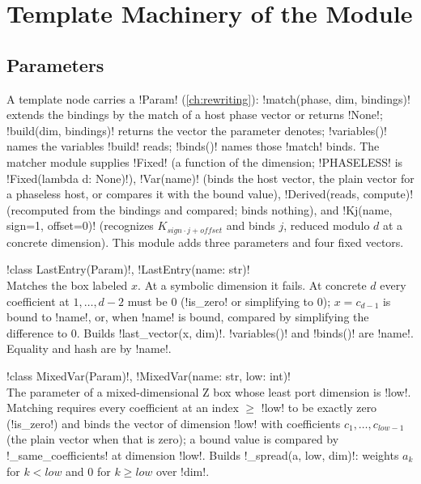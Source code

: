 \section{Template Machinery of the Module}\label{sec:completeness-machinery}

\subsection{Parameters}

A template node carries a \py!Param! (\cref{ch:rewriting}): \py!match(phase, dim, bindings)!
extends the bindings by the match of a host phase vector or returns \py!None!;
\py!build(dim, bindings)! returns the vector the parameter denotes; \py!variables()! names the
variables \py!build! reads; \py!binds()! names those \py!match! binds. The matcher module
supplies \py!Fixed! (a function of the dimension; \py!PHASELESS! is \py!Fixed(lambda d: None)!),
\py!Var(name)! (binds the host vector, the plain vector for a phaseless host, or compares it with
the bound value), \py!Derived(reads, compute)! (recomputed from the bindings and compared;
binds nothing), and \py!Kj(name, sign=1, offset=0)! (recognizes $K_{\mathit{sign}\cdot j+\mathit{offset}}$ and binds
$j$, reduced modulo $d$ at a concrete dimension). This module adds three parameters and four
fixed vectors.

\begin{signature}
\py!class LastEntry(Param)!, \py!LastEntry(name: str)!\\
Matches the box labeled $x$. At a symbolic dimension it fails. At concrete $d$ every
coefficient at $1,\dots,d-2$ must be $0$ (\py!is_zero! or simplifying to $0$); $x=c_{d-1}$ is bound
to \py!name!, or, when \py!name! is bound, compared by simplifying the difference to $0$. Builds
\py!last_vector(x, dim)!. \py!variables()! and \py!binds()! are \py!{name}!. Equality and
hash are by \py!name!.
\end{signature}

\begin{signature}
\py!class MixedVar(Param)!, \py!MixedVar(name: str, low: int)!\\
The parameter of a mixed-dimensional Z box whose least port dimension is \py!low!. Matching
requires every coefficient at an index $\ge$ \py!low! to be exactly zero (\py!is_zero!) and binds
the vector of dimension \py!low! with coefficients $c_1,\dots,c_{\mathit{low}-1}$ (the plain vector
when that is zero); a bound value is compared by \py!_same_coefficients! at dimension \py!low!.
Builds \py!_spread(a, low, dim)!: weights $a_k$ for $k<\mathit{low}$ and $0$ for $k\ge\mathit{low}$
over \py!dim!.
\end{signature}

